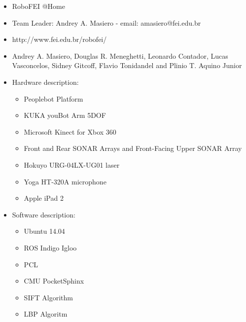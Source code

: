 \documentclass[runningheads,a4paper]{llncs}
\begin{document}
\newpage
\begin{itemize}
        \item RoboFEI @Home
        \item Team Leader: Andrey A. Masiero - email: amasiero@fei.edu.br
        \item http://www.fei.edu.br/robofei/
        \item Andrey A. Masiero, Douglas R. Meneghetti, Leonardo Contador, Lucas Vasconcelos, Sidney Gitcoff, Flavio Tonidandel and Plinio T. Aquino Junior
        \item Hardware description:
        \begin{itemize}
                \item Peoplebot Platform
                \item KUKA youBot Arm 5DOF
                \item Microsoft Kinect for Xbox 360
                \item Front and Rear SONAR Arrays and Front-Facing Upper SONAR Array
                \item Hokuyo URG-04LX-UG01 laser
                \item Yoga HT-320A microphone
                \item Apple iPad 2
        \end{itemize}
        \item Software description:
        \begin{itemize}
                \item Ubuntu 14.04
                \item ROS Indigo Igloo
                \item PCL
                \item CMU PocketSphinx
                \item SIFT Algorithm
                \item LBP Algoritm
        \end{itemize}
\end{itemize}
\end{document}
